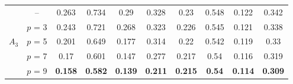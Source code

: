 \begin{table}[h]
\begin{tabular}{rrcrrrcrrr}
    \midrule
    
    \multicolumn{1}{l}{\multirow{5}[1]{*}{$A_3$}} & \multicolumn{1}{c}{--} & 0.263 & \multicolumn{1}{c}{0.734} & \multicolumn{1}{c}{0.29} & \multicolumn{1}{c}{0.328} & 0.23  & \multicolumn{1}{c}{0.548} & \multicolumn{1}{c}{0.122} & \multicolumn{1}{c}{0.342} \\
    \multicolumn{1}{l}{} & \multicolumn{1}{l}{$p$ = 3} & 0.243 & \multicolumn{1}{c}{0.721} & \multicolumn{1}{c}{0.268} & \multicolumn{1}{c}{0.323} & 0.226 & \multicolumn{1}{c}{0.545} & \multicolumn{1}{c}{0.121} & \multicolumn{1}{c}{0.338} \\
    \multicolumn{1}{l}{} & \multicolumn{1}{l}{$p$ = 5} & 0.201 & \multicolumn{1}{c}{0.649} & \multicolumn{1}{c}{0.177} & \multicolumn{1}{c}{0.314} & 0.22  & \multicolumn{1}{c}{0.542} & \multicolumn{1}{c}{0.119} & \multicolumn{1}{c}{0.33} \\
    \multicolumn{1}{l}{} & \multicolumn{1}{l}{$p$ = 7} & 0.17  & \multicolumn{1}{c}{0.601} & \multicolumn{1}{c}{0.147} & \multicolumn{1}{c}{0.277} & 0.217 & \multicolumn{1}{c}{0.54} & \multicolumn{1}{c}{0.116} & \multicolumn{1}{c}{0.319} \\
    \multicolumn{1}{l}{} & \multicolumn{1}{l}{$p$ = 9} & \textbf{0.158} & \multicolumn{1}{c}{\textbf{0.582}} & \multicolumn{1}{c}{\textbf{0.139}} & \multicolumn{1}{c}{\textbf{0.211}} & \textbf{0.215} & \multicolumn{1}{c}{\textbf{0.54}} & \multicolumn{1}{c}{\textbf{0.114}} & \multicolumn{1}{c}{\textbf{0.309}} \\
    \bottomrule
    \end{tabular}%
  \label{tab:exp_median_filtering}%
\end{table}%

